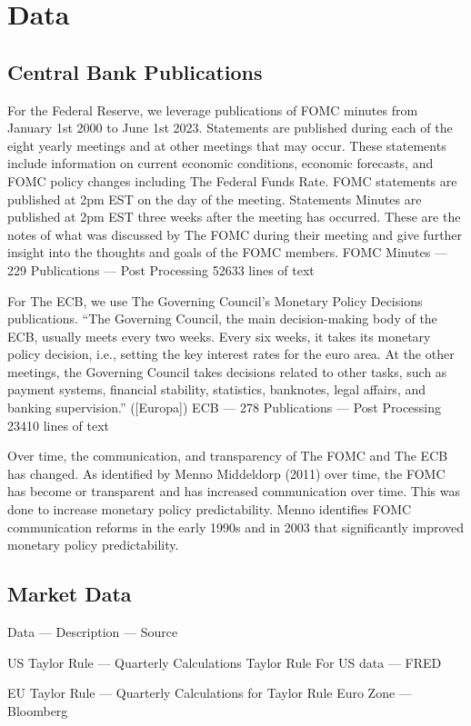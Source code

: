 \documentclass [12pt]{article}
\begin{document}
\section{Data}

\subsection{Central Bank Publications}
For the Federal Reserve, we leverage publications of FOMC minutes from January 1st 2000 to June 1st 2023. Statements are published during each of the eight yearly meetings and at other meetings that may occur. These statements include information on current economic conditions, economic forecasts, and FOMC policy changes including The Federal Funds Rate. FOMC statements are published at 2pm EST on the day of the meeting. Statements Minutes are published at 2pm EST three weeks after the meeting has occurred. These are the notes of what was discussed by The FOMC during their meeting and give further insight into the thoughts and goals of the FOMC members. FOMC Minutes — 229 Publications — Post Processing 52633 lines of text 

For The ECB, we use The Governing Council’s Monetary Policy Decisions publications. “The Governing Council, the main decision-making body of the ECB, usually meets every two weeks. Every six weeks, it takes its monetary policy decision, i.e., setting the key interest rates for the euro area. At the other meetings, the Governing Council takes decisions related to other tasks, such as payment systems, financial stability, statistics, banknotes, legal affairs, and banking supervision.” ([Europa]) ECB — 278 Publications — Post Processing 23410 lines of text

Over time, the communication, and transparency of The FOMC and The ECB has changed. As identified by Menno Middeldorp (2011)\cite{Menno11} over time, the FOMC has become or transparent and has increased communication over time. This was done to increase monetary policy predictability. Menno identifies FOMC communication reforms in the early 1990s and in 2003 that significantly improved monetary policy predictability. 
\subsection{Market Data}
Data — Description — Source 

US Taylor Rule — Quarterly Calculations Taylor Rule For US data — FRED

EU Taylor Rule — Quarterly Calculations for Taylor Rule Euro Zone — Bloomberg
\end{document}
